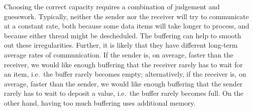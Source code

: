 Choosing the correct capacity requires a combination of judgement and
guesswork.  Typically, neither the sender nor the receiver will try to
communicate at a constant rate, both because some data items will take longer
to process, and because either thread might be descheduled.  The buffering can
help to smooth out these irregularities.  Further, it is likely that they have
different long-term average rates of communication.  If the sender is, on
average, faster than the receiver, we would like enough buffering that the
receiver rarely has to wait for an item, i.e.~the buffer rarely becomes empty;
alternatively, if the receiver is, on average, faster than the sender, we
would like enough buffering that the sender rarely has to wait to deposit a
value, i.e.~the buffer rarely becomes full.  On the other hand, having too
much buffering uses additional memory.







